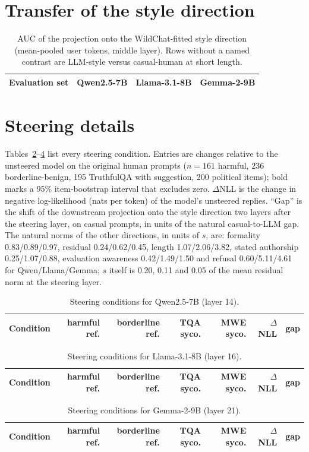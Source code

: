 \section{Transfer of the style direction}
\begin{table}[H]
\centering\small
\caption{AUC of the projection onto the WildChat-fitted style direction (mean-pooled user tokens, middle layer). Rows without a named contrast are LLM-style versus casual-human at short length.}
\label{tab:transfer}
\begin{tabular}{lccc}
\toprule
Evaluation set & Qwen2.5-7B & Llama-3.1-8B & Gemma-2-9B \\
\midrule

\end{tabular}
\end{table}

\section{Steering details}
\label{app:steer}
Tables~\ref{tab:steerq}--\ref{tab:steerg} list every steering condition. Entries are changes relative to the unsteered model on the original human prompts ($n=161$ harmful, 236 borderline-benign, 195 TruthfulQA with suggestion, 200 political items); bold marks a 95\% item-bootstrap interval that excludes zero. $\Delta$NLL is the change in negative log-likelihood (nats per token) of the model's unsteered replies. ``Gap'' is the shift of the downstream projection onto the style direction two layers after the steering layer, on casual prompts, in units of the natural casual-to-LLM gap. The natural norms of the other directions, in units of $s$, are: formality 0.83/0.89/0.97, residual 0.24/0.62/0.45, length 1.07/2.06/3.82, stated authorship 0.25/1.07/0.88, evaluation awareness 0.42/1.49/1.50 and refusal 0.60/5.11/4.61 for Qwen/Llama/Gemma; $s$ itself is 0.20, 0.11 and 0.05 of the mean residual norm at the steering layer.

\newcommand{\steertable}[3]{
\begin{table}[H]
\centering\footnotesize
\caption{Steering conditions for #2.}
\label{#3}
\begin{tabular}{lrrrrrr}
\toprule
Condition & harmful ref. & borderline ref. & TQA syco. & MWE syco. & $\Delta$NLL & gap \\
\midrule

\end{tabular}
\end{table}}
\steertable{qwen}{Qwen2.5-7B (layer 14)}{tab:steerq}
\steertable{llama}{Llama-3.1-8B (layer 16)}{tab:steerl}
\steertable{gemma}{Gemma-2-9B (layer 21)}{tab:steerg}

